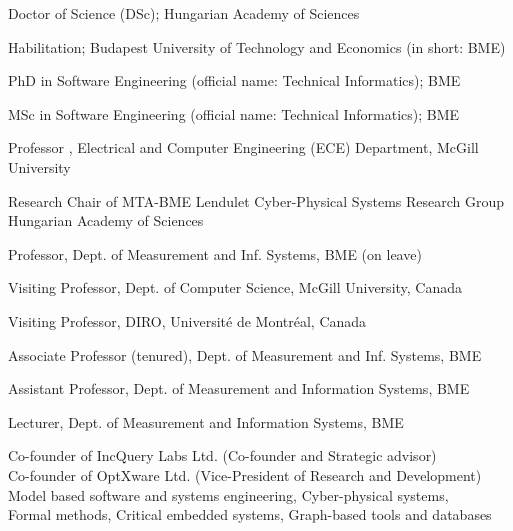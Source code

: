 \documentclass{xetexCV}
\begin{document}
\makecvtitle

\thispagestyle{empty}

Doctor of Science (DSc); Hungarian Academy of Sciences  


Habilitation; Budapest University of Technology and Economics (in short: BME) 

PhD in Software Engineering (official name: Technical Informatics);
BME %

MSc in Software Engineering (official name: Technical Informatics); 
BME %

Professor , Electrical and Computer Engineering (ECE) Department, McGill University

Research Chair  of MTA-BME Lendulet Cyber-Physical Systems Research Group \\ Hungarian Academy of Sciences 

Professor,  Dept. of Measurement and Inf. Systems, BME  (on leave)

Visiting Professor,  Dept. of Computer Science, McGill University, Canada

Visiting Professor,  DIRO, Universit\'e de Montr\'eal, Canada

Associate Professor (tenured),  Dept. of Measurement and
Inf. Systems, BME 	

Assistant Professor, Dept. of Measurement and
Information Systems, BME 

Lecturer, Dept. of Measurement and Information
Systems, BME

Co-founder of IncQuery Labs Ltd. (Co-founder and Strategic advisor)   \\
Co-founder of OptXware Ltd. (Vice-President of Research and Development)  \\

Model based software and systems engineering, Cyber-physical systems, \\
Formal methods, Critical embedded systems, Graph-based tools and databases
\end{document}
